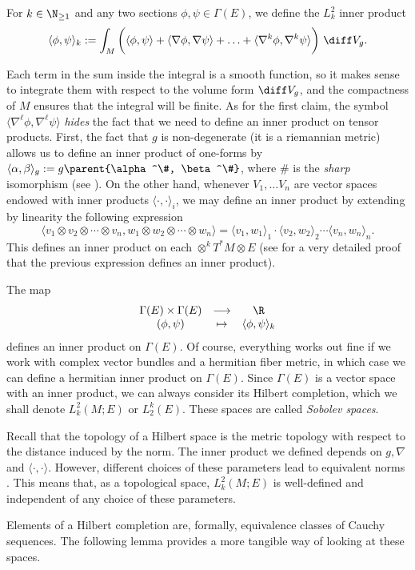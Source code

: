 For \(k \in \N_{\geq 1}\) and any two sections \(\phi, \psi \in \Gamma(E)\), we define the \(L_k^2\) inner product
\begin{equation} \label{prod_in_Gamma(E)}
\langle \phi, \psi\rangle_k:= \int_M \bigg( \langle \phi, \psi \rangle + \langle \nabla \phi, \nabla \psi \rangle  + \ldots+ \langle \nabla^k \phi, \nabla^k \psi \rangle \bigg) \ \diff V_g.
\end{equation}

\begin{obs}
    Each term in the sum inside the integral is a smooth function, so it makes sense to integrate them with respect to the volume form \(\diff V_g\), and the compactness of \(M\) ensures that the integral will be finite. As for the first claim, the symbol \(\langle \nabla^\ell \phi, \nabla^\ell\psi \rangle\) \textit{hides} the fact that we need to define an inner product on tensor products. First, the fact that \(g\) is non-degenerate (it is a riemannian metric) allows us to define an inner product of one-forms by \(\langle \alpha, \beta\rangle_g:=g\parent{\alpha^\#, \beta^\#}\), where \(\#\) is the \textit{sharp} isomorphism (see \parencite[Ch. 2]{lee_introRM}). On the other hand, whenever \(V_1, \ldots V_n\) are vector spaces endowed with inner products \(\langle\cdot, \cdot \rangle_i\), we may define an inner product by extending by linearity the following expression
    \[
    \langle v_1 \otimes v_2 \otimes \cdots \otimes v_n,  w_1 \otimes w_2 \otimes \cdots \otimes w_n \rangle = \langle v_1, w_1 \rangle_1 \cdot \langle v_2, w_2 \rangle_2 \cdots \langle v_n, w_n \rangle_n.
    \]
    This defines an inner product on each \(\otimes^k T^*M \otimes E\) (see \parencite[Lemma 1.7]{Rusman} for a very detailed proof that the previous expression defines an inner product).
\end{obs}
The map
\[
\begin{array}{ccc}
    \Gamma(E) \times \Gamma(E) & \longrightarrow & \R \\
    (\phi, \psi) & \mapsto & \langle \phi, \psi\rangle_k
\end{array}
\]
defines an inner product on \(\Gamma(E)\). Of course, everything works out fine if we work with complex vector bundles and a hermitian fiber metric, in which case we can define a hermitian inner product on \(\Gamma(E)\). Since \(\Gamma(E)\) is a vector space with an inner product, we can always consider its Hilbert completion, which we shall denote \(L_k^2(M;E)\) or \(L_2^k(E)\). These spaces are called \textit{Sobolev spaces}.
\begin{obs}
    Recall that the topology of a Hilbert space is the metric topology with respect to the distance induced by the norm. The inner product we defined depends on \(g, \nabla\) and \(\langle\cdot, \cdot \rangle\). However, different choices of these parameters lead to equivalent norms \parencite[page 418]{Rudolph_2017pug}. This means that, as a topological space, \(L^2_k(M;E)\) is well-defined and independent of any choice of these parameters.
\end{obs}
Elements of a Hilbert completion are, formally, equivalence classes of Cauchy sequences. The following lemma provides a more tangible way of looking at these spaces.

